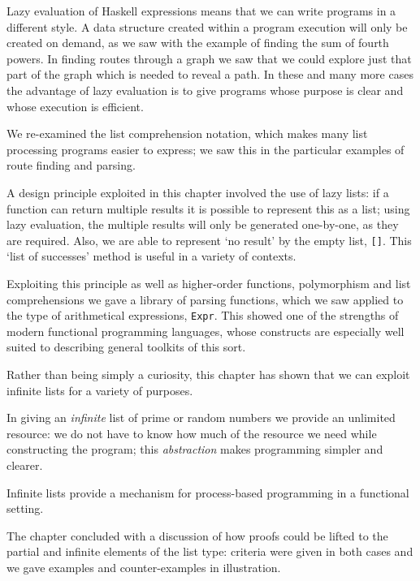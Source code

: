 \begin{summary}
Lazy evaluation of Haskell expressions means that we can write
programs in a different style. A data structure created within a program
execution will only be created on demand, as we saw with the example of
finding the sum of fourth powers. In finding routes through a graph we saw
that we could explore just that part of the graph which is needed to reveal a
path. In these and many more cases the advantage of lazy evaluation is to
give programs whose purpose is clear and whose execution is efficient.

We re-examined the list comprehension notation, which
makes many list processing programs easier to express; we saw this in the
particular examples of route finding and parsing.

A design principle exploited in this chapter involved
the use of lazy lists: if a function can return multiple
results it is possible to represent this as a list; using lazy evaluation, the
multiple results will only be generated one-by-one, as they are required.
Also, we are able to represent `no result' by the empty list, \texttt{[]}. This
`list of successes' method is useful in a variety of contexts.

Exploiting this principle as well as higher-order functions, polymorphism and 
list comprehensions we
gave a library of parsing functions, which we saw applied to the type of
arithmetical expressions, \texttt{Expr}. This showed one of the strengths of
modern functional programming languages, whose constructs are especially well
suited to describing general toolkits of this sort.

Rather than being simply a curiosity, this chapter has shown that we can
exploit infinite lists for a variety of purposes.
\begin{titemize}
\item In giving an {\em infinite\/} list of prime or random numbers we
provide an unlimited resource: we do not have to know how much of the
resource we need while constructing the program; this {\em abstraction\/}
makes programming simpler and clearer.
\item Infinite lists provide a mechanism for process-based programming in
a functional setting.
\end{titemize}

The chapter concluded with a discussion of how proofs could be lifted to the
partial and infinite elements of the list type: criteria were given in both
cases  and we gave examples and counter-examples in illustration.

\end{summary}

%
